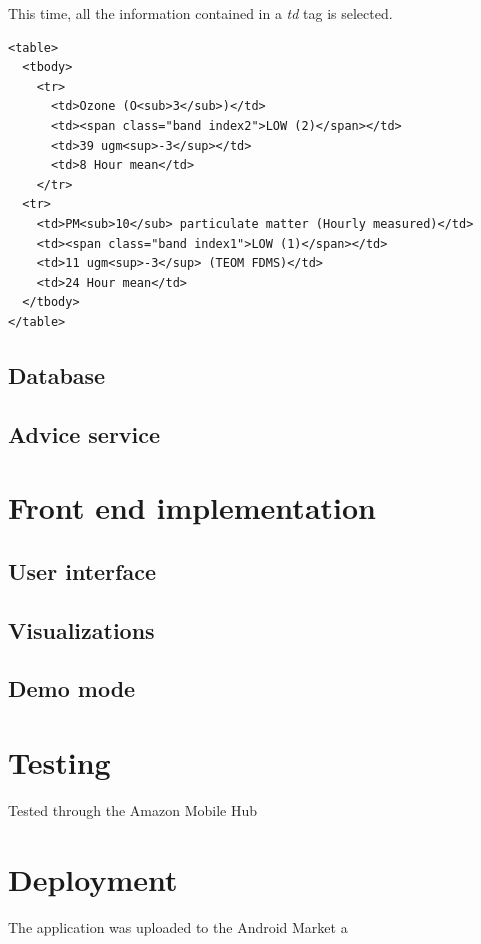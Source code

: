 This time, all the information contained in a \textit{td} tag is selected. 

\begin{Verbatim}[fontsize=\small,commandchars=\\\(\)]
<table>
  <tbody>
    <tr>
      <td>Ozone (O<sub>3</sub>)</td>
      <td><span class="band index2">LOW (2)</span></td>
      <td>39 ugm<sup>-3</sup></td>
      <td>8 Hour mean</td>
    </tr>
  <tr>
    <td>PM<sub>10</sub> particulate matter (Hourly measured)</td>
    <td><span class="band index1">LOW (1)</span></td>
    <td>11 ugm<sup>-3</sup> (TEOM FDMS)</td>
    <td>24 Hour mean</td>
  </tbody>
</table>                
\end{Verbatim}



\subsection{Database}
\subsection{Advice service}


\section{Front end implementation}
\subsection{User interface}
\subsection{Visualizations}
\subsection{Demo mode}

\section{Testing}
Tested through the Amazon Mobile Hub

\section{Deployment}
The application was uploaded to the Android Market a